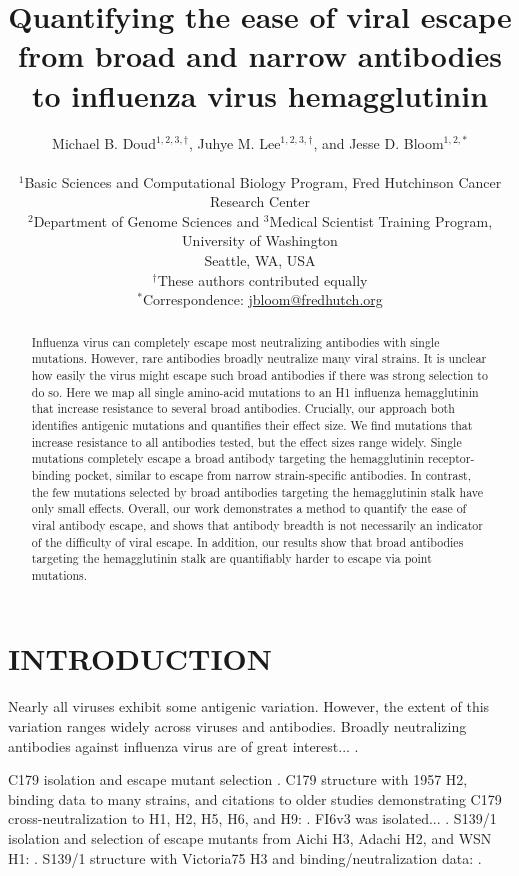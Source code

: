 \documentclass[11pt]{article}
\title{Quantifying the ease of viral escape from broad and narrow antibodies to influenza virus hemagglutinin}
\author
{Michael B. Doud$^{1,2,3,\dagger}$, Juhye M. Lee$^{1,2,3,\dagger}$, and Jesse D. Bloom$^{1,2,*}$\\
\\
\scriptsize{$^1$Basic Sciences and Computational Biology Program, Fred Hutchinson Cancer Research Center}\\
\scriptsize{$^2$Department of Genome Sciences and $^3$Medical Scientist Training Program, University of Washington} \\
\scriptsize{Seattle, WA, USA} \\
\scriptsize{$^{\dagger}$These authors contributed equally} \\
\scriptsize{$^*$Correspondence: \href{jbloom@fredhutch.org}{jbloom@fredhutch.org}}
}
\date{}
\begin{document}
\maketitle
\onehalfspacing

\begin{abstract}
Influenza virus can completely escape most neutralizing antibodies with single mutations.
However, rare antibodies broadly neutralize many viral strains.
It is unclear how easily the virus might escape such broad antibodies if there was strong selection to do so.
Here we map all single amino-acid mutations to an H1 influenza hemagglutinin that increase resistance to several broad antibodies.
Crucially, our approach both identifies antigenic mutations and quantifies their effect size.
We find mutations that increase resistance to all antibodies tested, but the effect sizes range widely. 
Single mutations completely escape a broad antibody targeting the hemagglutinin receptor-binding pocket, similar to escape from narrow strain-specific antibodies.   
In contrast, the few mutations selected by broad antibodies targeting the hemagglutinin stalk have only small effects. 
Overall, our work demonstrates a method to quantify the ease of viral antibody escape, and shows that antibody breadth is not necessarily an indicator of the difficulty of viral escape.
In addition, our results show that broad antibodies targeting the hemagglutinin stalk are quantifiably harder to escape via point mutations.
\end{abstract}

\section*{INTRODUCTION}
Nearly all viruses exhibit some antigenic variation.
However, the extent of this variation ranges widely across viruses and antibodies.
Broadly neutralizing antibodies against influenza virus are of great interest... \cite{corti2017tackling}. 

C179 isolation and escape mutant selection \cite{okuno1993common}.
C179 structure with 1957 H2, binding data to many strains, and citations to older studies demonstrating C179 cross-neutralization to H1, H2, H5, H6, and H9:  \cite{dreyfus2013structure}.
FI6v3 was isolated... \cite{corti2011neutralizing}.
S139/1 isolation and selection of escape mutants from Aichi H3, Adachi H2, and WSN H1: \cite{yoshida2009cross}.
S139/1 structure with Victoria75 H3 and binding/neutralization data: \cite{lee2012heterosubtypic}.
\end{document}
